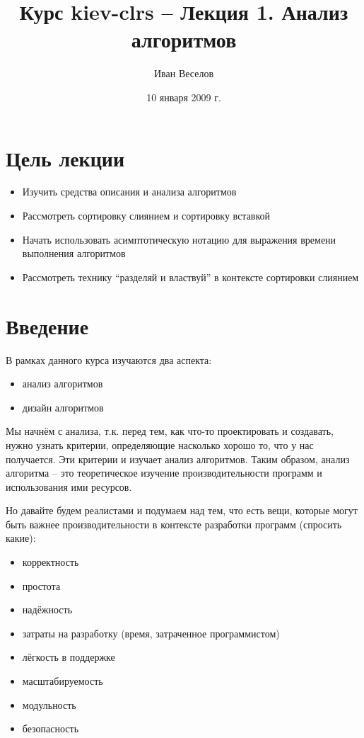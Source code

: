 \documentclass[a4paper,11pt]{article}
\author{Иван Веселов}
\title{Курс kiev-clrs -- Лекция 1. Анализ алгоритмов}
\date{10 января 2009 г.}
\begin{document}
\maketitle
\tableofcontents
\newpage

\setlength{\parskip}{1ex plus 0.5ex minus 0.2ex}

\section{Цель лекции}
\begin{itemize}
\item Изучить средства описания и анализа алгоритмов
\item Рассмотреть сортировку слиянием и сортировку вставкой
\item Начать использовать асимптотическую нотацию для выражения времени
  выполнения алгоритмов
\item Рассмотреть технику ``разделяй и властвуй'' в контексте сортировки
  слиянием
\end{itemize}

\section{Введение}
В рамках данного курса изучаются два аспекта:
\begin{itemize}
  \item анализ алгоритмов
  \item дизайн алгоритмов
\end{itemize}

Мы начнём с анализа, т.к. перед тем, как что-то проектировать и создавать, нужно
узнать критерии, определяющие насколько хорошо то, что у нас получается. Эти
критерии и изучает анализ алгоритмов. Таким образом, анализ алгоритма -- это
теоретическое изучение производительности программ и использования ими ресурсов.

Но давайте будем реалистами и подумаем над тем, что есть вещи, которые могут
быть важнее производительности в контексте разработки программ (спросить какие):

\begin{itemize}
\item корректность
\item простота
\item надёжность
\item затраты на разработку (время, затраченное программистом)
\item лёгкость в поддержке
\item масштабируемость
\item модульность
\item безопасность
\end{itemize}
\end{document}
